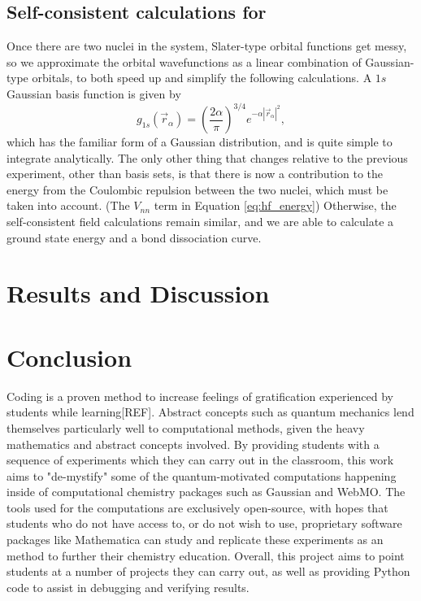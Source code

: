 \documentclass{achemso}
\begin{document}
\subsection{Self-consistent calculations for }
Once there are two nuclei in the system, Slater-type orbital functions get messy, so we approximate the orbital wavefunctions as a linear combination of Gaussian-type orbitals, to both speed up and simplify the following calculations.  A $1s$ Gaussian basis function is given by
\begin{equation}
	g_{1s}(\vec{r}_\alpha)=\left(\frac{2\alpha}{\pi}\right)^{3/4}e^{-\alpha|\vec{r}_\alpha|^2},
\end{equation}
which has the familiar form of a Gaussian distribution, and is quite simple to integrate analytically.  The only other thing that changes relative to the previous experiment, other than basis sets, is that there is now a contribution to the energy from the Coulombic repulsion between the two nuclei, which must be taken into account. (The $V_{nn}$ term in Equation \ref{eq:hf_energy})  Otherwise, the self-consistent field calculations remain similar, and we are able to calculate a ground state energy and a bond dissociation curve.
\section{Results and Discussion}
\section{Conclusion}
Coding is a proven method to increase feelings of gratification experienced by students while learning[REF].  Abstract concepts such as quantum mechanics lend themselves particularly well to computational methods, given the heavy mathematics and abstract concepts involved.  By providing students with a sequence of experiments which they can carry out in the classroom, this work aims to "de-mystify" some of the quantum-motivated computations happening inside of computational chemistry packages such as Gaussian and WebMO. The tools used for the computations are exclusively open-source, with hopes that students who do not have access to, or do not wish to use, proprietary software packages like Mathematica can study and replicate these experiments as an method to further their chemistry education. Overall, this project aims to point students at a number of projects they can carry out, as well as providing Python code to assist in debugging and verifying results. 
\end{document}
